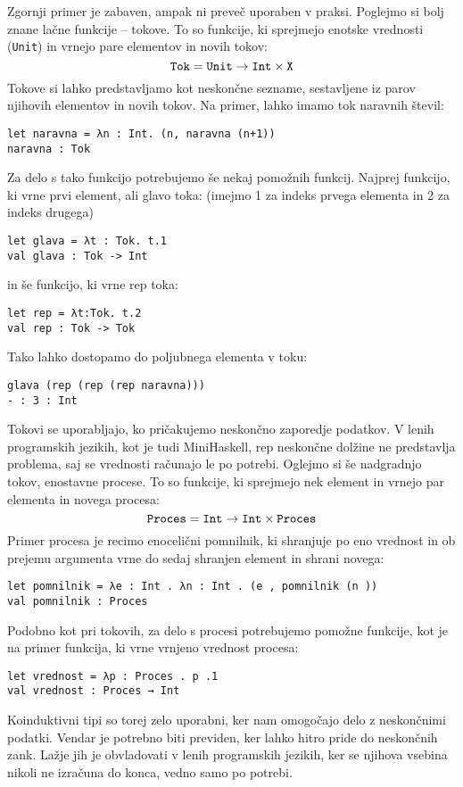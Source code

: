 \documentclass[12pt,a4paper,openany]{book}
\begin{document}
Zgornji primer je zabaven, ampak ni preveč uporaben v praksi. Poglejmo si bolj znane lačne funkcije -- tokove. To so funkcije, ki sprejmejo enotske vrednosti (\lstinline{Unit}) in vrnejo pare elementov in novih tokov:
\begin{equation}
    \mathtt{Tok} = \mathtt{Unit} \rightarrow \mathtt{Int} \times \mathtt{X} \notag
\end{equation}
Tokove si lahko predstavljamo kot neskončne sezname, sestavljene iz parov njihovih elementov in novih tokov. Na primer, lahko imamo tok naravnih števil:
\begin{lstlisting}
let naravna = λn : Int. (n, naravna (n+1))
naravna : Tok
\end{lstlisting}
Za delo s tako funkcijo potrebujemo še nekaj pomožnih funkcij. Najprej funkcijo, ki vrne prvi element, ali glavo toka: (imejmo 1 za indeks prvega elementa in 2 za indeks drugega)
\begin{lstlisting}
let glava = λt : Tok. t.1
val glava : Tok -> Int
\end{lstlisting}
in še funkcijo, ki vrne rep toka:
\begin{lstlisting}
let rep = λt:Tok. t.2
val rep : Tok -> Tok
\end{lstlisting}
Tako lahko dostopamo do poljubnega elementa v toku:
\begin{lstlisting}
glava (rep (rep (rep naravna)))
- : 3 : Int
\end{lstlisting}
Tokovi se uporabljajo, ko pričakujemo neskončno zaporedje podatkov. V lenih programskih jezikih, kot je tudi MiniHaskell, rep neskončne dolžine
ne predstavlja problema, saj se vrednosti računajo le po potrebi.
Oglejmo si še nadgradnjo tokov, enostavne procese. To so funkcije, ki sprejmejo nek element in vrnejo par elementa in novega procesa:
\begin{equation}
    \mathtt{Proces} = \mathtt{Int} \rightarrow \mathtt{Int} \times \mathtt{Proces} \notag
\end{equation}
Primer procesa je recimo enocelični pomnilnik, ki shranjuje po eno vrednost in ob prejemu argumenta vrne do sedaj shranjen element in shrani novega:
\begin{lstlisting}
let pomnilnik = λe : Int . λn : Int . (e , pomnilnik (n ))
val pomnilnik : Proces  
\end{lstlisting}
Podobno kot pri tokovih, za delo s procesi potrebujemo pomožne funkcije, kot je na primer funkcija, ki vrne vrnjeno vrednost procesa:
\begin{lstlisting}
let vrednost = λp : Proces . p .1
val vrednost : Proces → Int  
\end{lstlisting}
Koinduktivni tipi so torej zelo uporabni, ker nam omogočajo delo z neskončnimi podatki. Vendar je potrebno biti previden, ker lahko hitro pride do neskončnih zank. 
Lažje jih je obvladovati v lenih programskih jezikih, ker se njihova vsebina nikoli ne izračuna do konca, vedno samo po potrebi.
\end{document}
